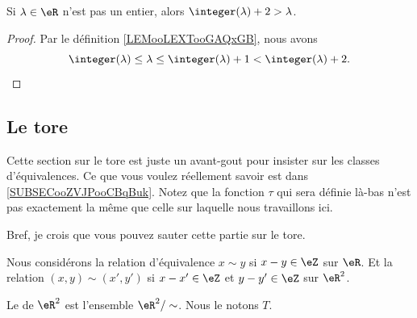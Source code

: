 \begin{lemma}       \label{LEMooMMSAooFiRkQd}
	Si \( \lambda\in \eR\) n'est pas un entier, alors \( \integer(\lambda)+2>\lambda\).
\end{lemma}

\begin{proof}
	Par le définition \ref{LEMooLEXTooGAQxGB}, nous avons
	\begin{equation}
		\integer(\lambda)\leq \lambda\leq \integer(\lambda)+1<\integer(\lambda)+2.
	\end{equation}
\end{proof}

\subsection{Le tore}

\begin{normaltext}
	Cette section sur le tore est juste un avant-gout pour insister sur les classes d'équivalences. Ce que vous voulez réellement savoir est dans \ref{SUBSECooZVJPooCBqBuk}. Notez que la fonction \( \tau\) qui sera définie là-bas n'est pas exactement la même que celle sur laquelle nous travaillons ici.

	Bref, je crois que vous pouvez sauter cette partie sur le tore.
\end{normaltext}


\begin{definition}	\label{DEFooRWLLooHkdFDN}
	Nous considérons la relation d'équivalence \( x\sim y\) si \( x-y\in \eZ\) sur \( \eR\). Et la relation \( (x,y)\sim(x',y')\) si \( x-x'\in \eZ\) et \( y-y'\in \eZ\) sur \( \eR^2\).
\end{definition}


\begin{definition}	\label{DEFooTSSTooOFPxzu}
	Le  de \( \eR^2\) est l'ensemble \( \eR^2/\sim\). Nous le notons \( T\).
\end{definition}

